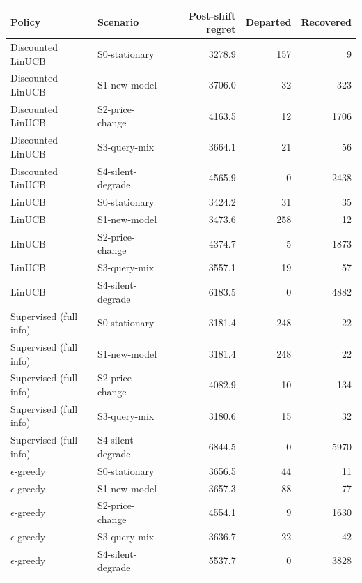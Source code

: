 \begin{tabular}{llrrr}
\toprule
Policy & Scenario & Post-shift regret & Departed & Recovered \\
\midrule
Discounted LinUCB & S0-stationary & 3278.9 & 157 & 9 \\
Discounted LinUCB & S1-new-model & 3706.0 & 32 & 323 \\
Discounted LinUCB & S2-price-change & 4163.5 & 12 & 1706 \\
Discounted LinUCB & S3-query-mix & 3664.1 & 21 & 56 \\
Discounted LinUCB & S4-silent-degrade & 4565.9 & 0 & 2438 \\
LinUCB & S0-stationary & 3424.2 & 31 & 35 \\
LinUCB & S1-new-model & 3473.6 & 258 & 12 \\
LinUCB & S2-price-change & 4374.7 & 5 & 1873 \\
LinUCB & S3-query-mix & 3557.1 & 19 & 57 \\
LinUCB & S4-silent-degrade & 6183.5 & 0 & 4882 \\
Supervised (full info) & S0-stationary & 3181.4 & 248 & 22 \\
Supervised (full info) & S1-new-model & 3181.4 & 248 & 22 \\
Supervised (full info) & S2-price-change & 4082.9 & 10 & 134 \\
Supervised (full info) & S3-query-mix & 3180.6 & 15 & 32 \\
Supervised (full info) & S4-silent-degrade & 6844.5 & 0 & 5970 \\
$\epsilon$-greedy & S0-stationary & 3656.5 & 44 & 11 \\
$\epsilon$-greedy & S1-new-model & 3657.3 & 88 & 77 \\
$\epsilon$-greedy & S2-price-change & 4554.1 & 9 & 1630 \\
$\epsilon$-greedy & S3-query-mix & 3636.7 & 22 & 42 \\
$\epsilon$-greedy & S4-silent-degrade & 5537.7 & 0 & 3828 \\
\bottomrule
\end{tabular}